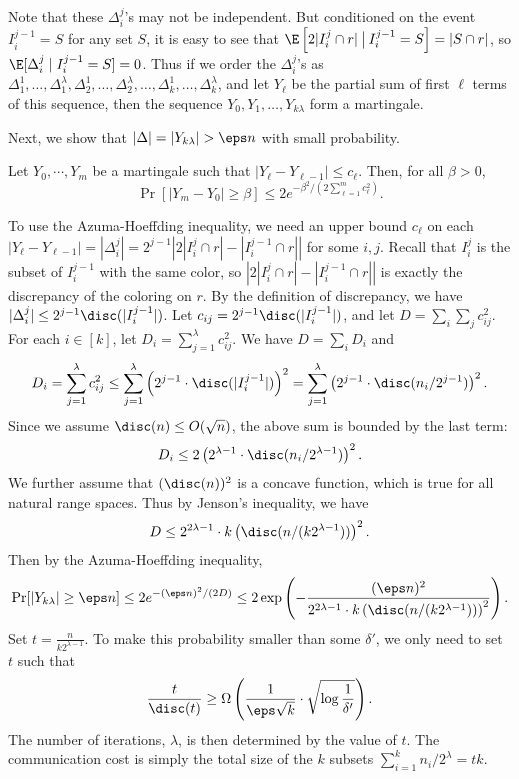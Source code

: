 Note that these $\Delta_i^j$'s may not be independent.  But conditioned on the event
$I_i^{j-1}=S$ for any set $S$, it is easy to see that $\E\left[2|I_i^j\cap r| \:{\big
    |}\:I_i^{j-1}=S\right]= |S\cap r| $, so $\E[\Delta_i^j \mid I_i^{j-1}=S]=0$.  Thus if
we order the $\Delta_i^j$'s as $\Delta_1^1, \dots, \Delta_1^\lambda, \Delta_2^1, \dots,
\Delta_2^\lambda, \dots, \Delta_k^1, \dots, \Delta_k^\lambda$, and let $Y_\ell$ be the
partial sum of first $\ell$ terms of this sequence, then the sequence $Y_0, Y_1,\dots,
Y_{k\lambda}$ form a martingale.  

Next, we show that $|\Delta| = |Y_{k\lambda}| > \eps n$ with small probability.  
\begin{lemma}
  Let $Y_0,\cdots, Y_m$ be a martingale such that $|Y_\ell-Y_{\ell-1}|\le c_\ell$. Then,
  for all $\beta>0$,
$$\Pr[|Y_m-Y_0|\ge \beta]\le 2e^{-\beta^2/(2\sum_{\ell=1}^{m}c_\ell^2)}.$$
\end{lemma}

To use the Azuma-Hoeffding inequality, we need an upper bound $c_\ell$ on each $|Y_\ell -
Y_{\ell-1}| = |\Delta_i^j| = 2^{j-1}\left|2 |I_i^j \cap r| - |I_i^{j-1} \cap r|\right|$
for some $i,j$.  Recall that $I_i^j$ is the subset of $I_i^{j-1}$ with the same color, so
$\left|2 |I_i^j \cap r| - |I_i^{j-1} \cap r|\right|$ is exactly the discrepancy of the
coloring on $r$.  By the definition of discrepancy, we have $|\Delta_i^j| \le
2^{j-1}\disc(|I_i^{j-1}|)$.  Let $c_{ij} = 2^{j-1}\disc(|I_i^{j-1}|)$, and let
$D=\sum_i\sum_j c_{ij}^2$. For each $i\in[k]$, let $D_i=\sum_{j=1}^\lambda
c_{ij}^2$.  We have $D=\sum_i D_i$ and
$$D_i=\sum_{j=1}^\lambda c_{ij}^2\le \sum_{j=1}^\lambda \left(2^{j-1}\cdot
  \disc(|I_i^{j-1}|)\right)^2= \sum_{j=1}^\lambda\left(2^{j-1}\cdot
  \disc(n_i/2^{j-1})\right)^2.$$
Since we assume $\disc(n)\le O(\sqrt{n})$, the above sum
is bounded by the last term: $$D_i\le 2\left(2^{\lambda-1}\cdot
  \disc(n_i/2^{\lambda-1})\right)^2.$$
We further assume that $(\disc(n))^2$ is a concave
function, which is true for all natural range spaces. Thus by Jenson's inequality, we have
$$D\le 2^{2\lambda-1}\cdot k\left( \disc(n/(k2^{\lambda-1}))\right)^2.$$
Then by the Azuma-Hoeffding inequality, 
$$\Pr[|Y_{k\lambda}|\ge\eps n] \le 2e^{-(\eps n)^2/(2D)}\le 2\exp\left(-\frac{(\eps
    n)^2}{2^{2\lambda-1}\cdot k\left( \disc(n/(k2^{\lambda-1}))\right)^2}\right).$$
Set $t=\frac{n}{k2^{\lambda-1}}$.  To make this probability smaller than some
$\delta'$, we only need to set $t$ such that
$$\frac{t}{\disc(t)}\ge\Omega\left(\frac{1}{\eps\sqrt{k}}\cdot
  \sqrt{\log\frac{1}{\delta'}}\right).$$ 
The number of iterations, $\lambda$, is then determined by the value of $t$.  The
communication cost is simply the total size of the $k$ subsets $\sum_{i=1}^k
n_i/2^{\lambda}=tk$. 

